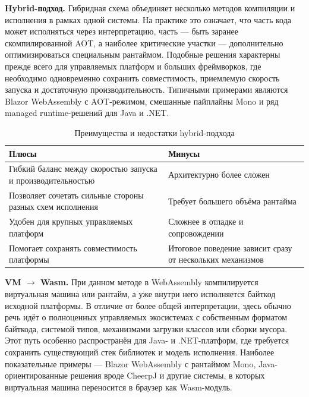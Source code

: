 \documentclass[12pt, oneside]{book}
\begin{document}
    \quad \textbf{Hybrid-подход.} Гибридная схема объединяет несколько методов компиляции и исполнения в рамках одной системы. На практике это означает, что часть кода может исполняться через интерпретацию, часть --- быть заранее скомпилированной AOT, а наиболее критические участки --- дополнительно оптимизироваться специальным рантаймом. Подобные решения характерны прежде всего для управляемых платформ и больших фреймворков, где необходимо одновременно сохранить совместимость, приемлемую скорость запуска и достаточную производительность. Типичными примерами являются Blazor WebAssembly с AOT-режимом, смешанные пайплайны Mono и ряд managed runtime-решений для Java и .NET.

\begin{table}[htbp]
\centering
\scriptsize
\renewcommand{\arraystretch}{1.15}
\begin{tabular}{|p{5.8cm}|p{5.8cm}|}
\hline
\textbf{Плюсы} & \textbf{Минусы} \\
\hline
Гибкий баланс между скоростью запуска и производительностью & Архитектурно более сложен \\
\hline
Позволяет сочетать сильные стороны разных схем исполнения & Требует большего объёма рантайма \\
\hline
Удобен для крупных управляемых платформ & Сложнее в отладке и сопровождении \\
\hline
Помогает сохранять совместимость платформы & Итоговое поведение зависит сразу от нескольких механизмов \\
\hline
\end{tabular}
\caption{Преимущества и недостатки hybrid-подхода}
\label{tab:hybrid_pros_cons}
\end{table}

    \quad \textbf{VM $\rightarrow$ Wasm.} При данном методе в WebAssembly компилируется виртуальная машина или рантайм, а уже внутри него исполняется байткод исходной платформы. В отличие от более общей интерпретации, здесь обычно речь идёт о полноценных управляемых экосистемах с собственным форматом байткода, системой типов, механизмами загрузки классов или сборки мусора. Этот путь особенно распространён для Java- и .NET-платформ, где требуется сохранить существующий стек библиотек и модель исполнения. Наиболее показательные примеры --- Blazor WebAssembly с рантаймом Mono, Java-ориентированные решения вроде CheerpJ и другие системы, в которых виртуальная машина переносится в браузер как Wasm-модуль.
\end{document}
